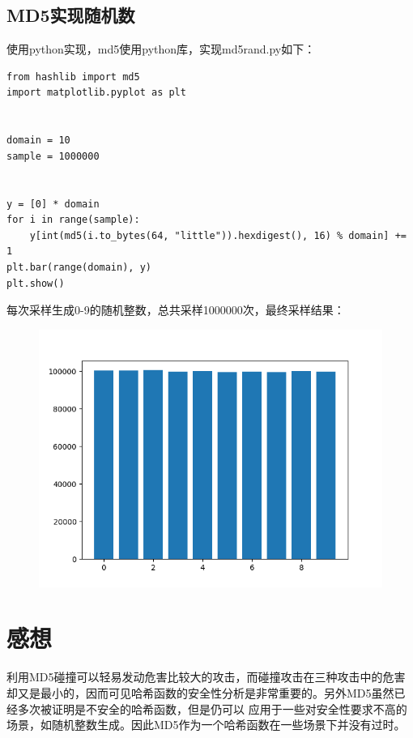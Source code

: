 \documentclass[UTF8, a4paper, 11pt]{article}
\begin{document}
\subsection{MD5实现随机数}
使用python实现，md5使用python库，实现md5rand.py如下：
\begin{lstlisting}
from hashlib import md5
import matplotlib.pyplot as plt


domain = 10
sample = 1000000


y = [0] * domain
for i in range(sample):
    y[int(md5(i.to_bytes(64, "little")).hexdigest(), 16) % domain] += 1
plt.bar(range(domain), y)
plt.show()
\end{lstlisting}
每次采样生成0-9的随机整数，总共采样1000000次，最终采样结果：
\begin{figure}[H]
    \centering
    \includegraphics[width = \textwidth]{rand.png}
\end{figure}
\section{感想}
利用MD5碰撞可以轻易发动危害比较大的攻击，而碰撞攻击在三种攻击中的危害却又是最小的，因而可见哈希函数的安全性分析是非常重要的。另外MD5虽然已经多次被证明是不安全的哈希函数，但是仍可以
应用于一些对安全性要求不高的场景，如随机整数生成。因此MD5作为一个哈希函数在一些场景下并没有过时。

%
%
\end{document}
